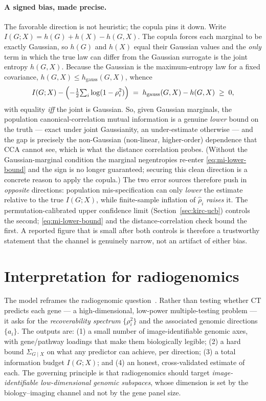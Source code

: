 \documentclass{article}
\newcommand{\Sgcx}{\Sigma_{G\mid X}}
\begin{document}
\paragraph{A signed bias, made precise.}
The favorable direction is not heuristic; the copula pins it down. Write
$I(G;X) = h(G) + h(X) - h(G,X)$. The copula forces each marginal to be exactly
Gaussian, so $h(G)$ and $h(X)$ equal their Gaussian values and the \emph{only}
term in which the true law can differ from the Gaussian surrogate is the joint
entropy $h(G,X)$. Because the Gaussian is the maximum-entropy law for a fixed
covariance, $h(G,X) \le h_{\mathrm{gauss}}(G,X)$, whence
\begin{equation}
I(G;X) - \Bigl(-\tfrac12{\textstyle\sum_i}\log(1-\rho_i^2)\Bigr)
\;=\; h_{\mathrm{gauss}}(G,X) - h(G,X) \;\ge\; 0,
\label{eq:mi-lower-bound}
\end{equation}
with equality \emph{iff} the joint is Gaussian. So, given Gaussian marginals,
the population canonical-correlation mutual information is a genuine \emph{lower}
bound on the truth --- exact under joint Gaussianity, an under-estimate
otherwise --- and the gap is precisely the non-Gaussian (non-linear,
higher-order) dependence that CCA cannot see, which is what the distance
correlation probes. (Without the Gaussian-marginal condition the marginal
negentropies re-enter \eqref{eq:mi-lower-bound} and the sign is no longer
guaranteed; securing this clean direction is a concrete reason to apply the
copula.) The two error sources therefore push in \emph{opposite} directions:
population mis-specification can only \emph{lower} the estimate relative to the
true $I(G;X)$, while finite-sample inflation of $\hat\rho_i$ \emph{raises} it.
The permutation-calibrated upper confidence limit
(Section~\ref{sec:kirc-ucb}) controls the second; \eqref{eq:mi-lower-bound} and
the distance-correlation check bound the first. A reported figure that is small
after both controls is therefore a trustworthy statement that the channel is
genuinely narrow, not an artifact of either bias.

\section{Interpretation for radiogenomics}
\label{sec:interpretation}

The model reframes the radiogenomic
question~\citep{rutman2009radiogenomics,gillies2016radiomics,lambin2017radiomics,bodalal2019radiogenomics}.
Rather than testing whether CT
predicts each gene --- a high-dimensional, low-power multiple-testing problem ---
it asks for the \emph{recoverability spectrum} $\{\rho_i^2\}$ and the associated
genomic directions $\{a_i\}$. The outputs are: (1) a small number of
image-identifiable genomic axes, with gene/pathway loadings that make them
biologically legible; (2) a hard bound $\Sgcx$ on what any predictor can achieve,
per direction; (3) a total information budget $I(G;X)$; and (4) an honest,
cross-validated estimate of each. The governing principle is that radiogenomics
should target \emph{image-identifiable low-dimensional genomic subspaces}, whose
dimension is set by the biology--imaging channel and not by the gene panel size.
\end{document}

